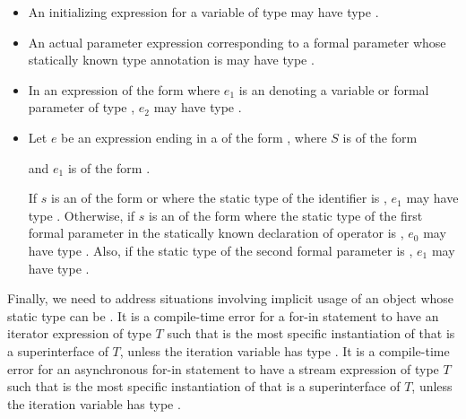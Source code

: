 \documentclass[makeidx]{article}
\begin{document}
{\begin{itemize}
{  (\ref{functions}).%
  }
\item
  An initializing expression for a variable of type \VOID{}
  may have type \VOID.
\item
  An actual parameter expression corresponding to a formal parameter
  whose statically known type annotation is \VOID{}
  may have type \VOID.
\item
  In an expression of the form 
  where $e_1$ is an 
  denoting a variable or formal parameter of type \VOID,
  $e_2$ may have type \VOID.
\item
  Let $e$ be an expression ending in a 
  of the form ,
  where $S$ is of the form

  \noindent

  \noindent
  and $e_1$ is of the form .

  If $s$ is an  of the
  form  or 
  where the static type of the identifier \id{} is \VOID,
  $e_1$ may have type \VOID.
  Otherwise, if $s$ is an  of the form
  \code{[$\,e_0\,$]} where the static type of
  the first formal parameter in the statically known declaration
  of operator \code{[]=} is \VOID,
  $e_0$ may have type \VOID.
  Also, if the static type of the second formal parameter is \VOID,
  $e_1$ may have type \VOID.
\end{itemize}

\LMHash{}%
Finally, we need to address situations involving implicit usage of
an object whose static type can be \VOID.
%
It is a compile-time error for a for-in statement to have an iterator
expression of type $T$ such that 
is the most specific instantiation of 
that is a superinterface of $T$, unless the
iteration variable has type \VOID.
%
It is a compile-time error for an asynchronous for-in statement
to have a stream expression of type $T$
such that  is the most specific
instantiation of  that is a superinterface of $T$,
unless the iteration variable has type \VOID.

}
\end{document}
